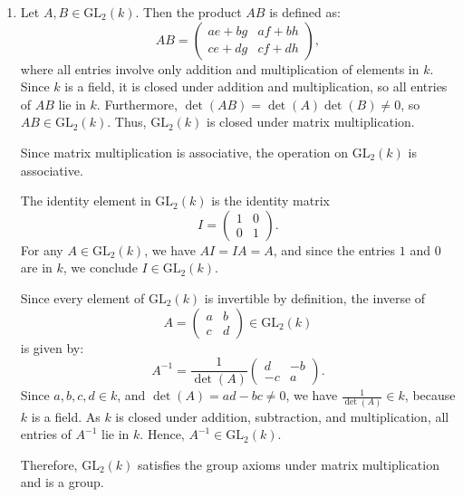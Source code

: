 \documentclass[12pt]{article}
\begin{document}
\begin{enumerate}[label=(\arabic*)] 


\item 
Let \( A, B \in \mathrm{GL}_2(k) \). Then the product \( AB \) is defined as:
\[
AB = \begin{pmatrix}
ae + bg & af + bh \\
ce + dg & cf + dh
\end{pmatrix},
\]
where all entries involve only addition and multiplication of elements in \( k \). Since \( k \) is a field, it is closed under addition and multiplication, so all entries of \( AB \) lie in \( k \). Furthermore, \( \det(AB) = \det(A)\det(B) \neq 0 \), so \( AB \in \mathrm{GL}_2(k) \). Thus, \( \mathrm{GL}_2(k) \) is closed under matrix multiplication.

Since matrix multiplication is associative, the operation on \( \mathrm{GL}_2(k) \) is associative.

The identity element in \( \mathrm{GL}_2(k) \) is the identity matrix
\[
I = \begin{pmatrix} 1 & 0 \\ 0 & 1 \end{pmatrix}.
\]
For any \( A \in \mathrm{GL}_2(k) \), we have \( AI = IA = A \), and since the entries \( 1 \) and \( 0 \) are in \( k \), we conclude \( I \in \mathrm{GL}_2(k) \).

Since every element of \( \mathrm{GL}_2(k) \) is invertible by definition, the inverse of
\[
A = \begin{pmatrix} a & b \\ c & d \end{pmatrix} \in \mathrm{GL}_2(k)
\]
is given by:
\[
A^{-1} = \frac{1}{\det(A)} \begin{pmatrix} d & -b \\ -c & a \end{pmatrix}.
\]
Since \( a, b, c, d \in k \), and \( \det(A) = ad - bc \neq 0 \), we have \( \frac{1}{\det(A)} \in k \), because \( k \) is a field. As \( k \) is closed under addition, subtraction, and multiplication, all entries of \( A^{-1} \) lie in \( k \). Hence, \( A^{-1} \in \mathrm{GL}_2(k) \).

Therefore, \( \mathrm{GL}_2(k) \) satisfies the group axioms under matrix multiplication and is a group.


\end{enumerate}
\end{document}
